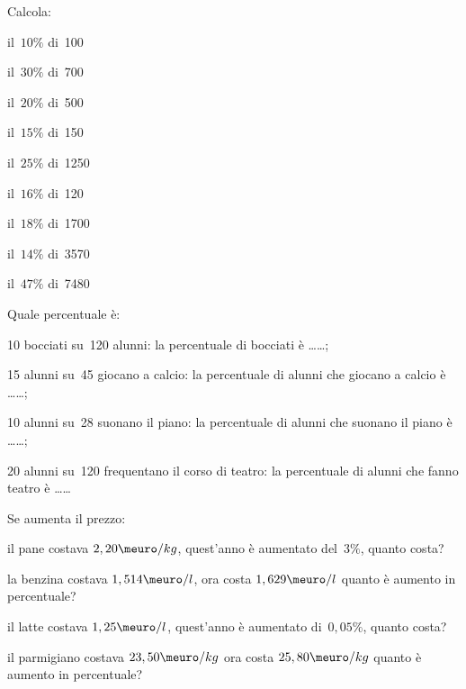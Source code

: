 \begin{esercizio}
\label{ese:3.90}
Calcola:

\begin{htmulticols}{3}
\begin{enumeratees}
\item il~\(10\%\) di~100
\item il~\(30\%\) di~700
\item il~\(20\%\) di~500
\item il~\(15\%\) di~150
\item il~\(25\%\) di~1250
\item il~\(16\%\) di~120
\item il~\(18\%\) di~1700
\item il~\(14\%\) di~3570
\item il~\(47\%\) di~7480
\end{enumeratees}
\end{htmulticols}
\end{esercizio}

\begin{esercizio}
\label{ese:3.91}
Quale percentuale è:
\begin{enumeratees}
 \item 10 bocciati su~120 alunni: la percentuale di bocciati è \ldots\ldots;
 \item 15 alunni su~45 giocano a calcio: la percentuale di alunni che giocano 
 a calcio è \ldots\ldots;
 \item 10 alunni su~28 suonano il piano: la percentuale di alunni che suonano 
 il piano è \ldots\ldots;
 \item 20 alunni su~120 frequentano il corso di teatro: la percentuale di 
 alunni che fanno teatro è \ldots\ldots
\end{enumeratees}
\end{esercizio}


\begin{esercizio}
\label{ese:3.92}
Se aumenta il prezzo:
\begin{enumeratees}
\item il pane costava \(2,20\meuro/kg\), quest'anno 
è aumentato del~\(3\%\), quanto costa?
\item la benzina costava \(1,514\meuro/l\), 
ora costa \(1,629\meuro/l\) quanto è aumento in percentuale?
\item il latte costava \(1,25\meuro/l\), 
quest'anno è aumentato di~\(0,05\%\), quanto costa?
\item il parmigiano costava  \(23,50\meuro/kg\) 
ora costa \(25,80\meuro/kg\) quanto è aumento in percentuale?
\end{enumeratees}
\end{esercizio}

